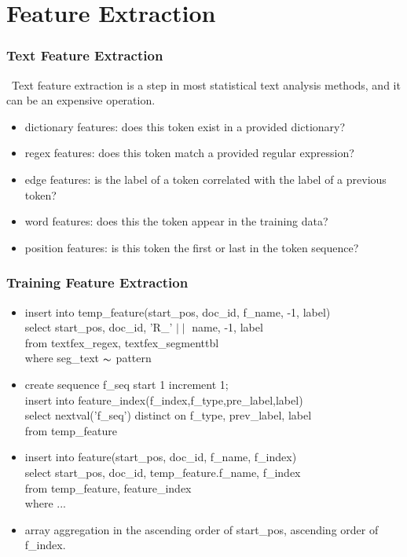 \documentclass{beamer}
\begin{document}
\section{Feature Extraction}
\begin{frame}
  \frametitle{Text Feature Extraction}
   \ Text feature extraction is a step in most statistical text analysis methods, and it can be an expensive operation. 
     \begin{itemize}
      \item dictionary features: does this token exist in a provided dictionary? 
      \item regex features: does this token match a provided regular expression? 
      \item edge features: is the label of a token correlated with the label of a previous token? 
      \item word features: does this the token appear in the training data? 
      \item position features: is this token the first or last in the token sequence? 
     \end{itemize}
\end{frame}

\begin{frame}
  \frametitle{Training Feature Extraction}
  \begin{itemize}
  \item insert into temp\_feature(start\_pos, doc\_id, f\_name, -1, label)\\ 
        select start\_pos, doc\_id, 'R\_' $\mid\mid$ name, -1, label\\
        from   textfex\_regex, textfex\_segmenttbl\\
        where  seg\_text $\thicksim$ pattern\\
  \item create sequence f\_seq start 1 increment 1;\\
        insert into feature\_index(f\_index,f\_type,pre\_label,label)\\ 
        select nextval('f\_seq') distinct on f\_type, prev\_label, label\\
        from   temp\_feature\\
  \item insert into feature(start\_pos, doc\_id, f\_name, f\_index)\\
        select start\_pos, doc\_id, temp\_feature.f\_name, f\_index\\
        from   temp\_feature, feature\_index\\
        where ...\\
  \item array aggregation in the ascending order of start\_pos, ascending order of f\_index.
  \end{itemize}
\end{frame}
\end{document}

